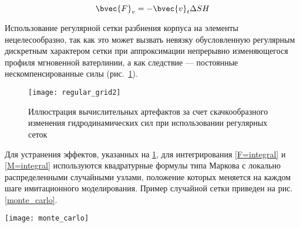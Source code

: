 \begin{equation}
	\bvec{F}_v = -\bvec{v}_t \Delta S H
\end{equation}






Использование регулярной сетки разбиения корпуса на элементы нецелесообразно, так как
это может вызвать невязку обусловленную регулярным дискретным характером сетки при аппроксимации непрерывно изменяющегося профиля мгновенной ватерлинии, а как следствие --- постоянные нескомпенсированные силы (рис.~\ref{regular_grid}).

\begin{figure}[ht]
\begin{center}
\texttt{[image: regular\_grid2]}
\end{center}
\caption{Иллюстрация вычислительных артефактов за счет скачкообразного изменения гидродинамических сил при использовании регулярных сеток}
\label{regular_grid}
\end{figure}

Для устранения эффектов, указанных на \ref{regular_grid}, для интегрирования \eqref{F=integral} и \eqref{M=integral} используются квадратурные формулы типа Маркова с локально распределенными случайными узлами, положение которых меняется на каждом шаге имитационного моделирования. Пример случайной сетки приведен на рис. \ref{monte_carlo}.

\begin{sidewaysfigure}[ht]
\begin{center}
\texttt{[image: monte\_carlo]}
\end{center}
\caption{Пример сетки с локально-распределенными случайными узлами}
\label{monte_carlo}
\end{sidewaysfigure}

